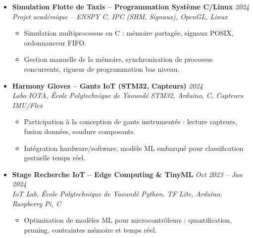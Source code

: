 \documentclass[a4paper,11pt]{article}
\begin{document}
\begin{itemize}[leftmargin=*, label={-}]
\item \textbf{Simulation Flotte de Taxis -- Programmation Système C/Linux} \hfill \textit{2024} \\
\textit{Projet académique -- ENSPY} \hfill \textit{C, IPC (SHM, Signaux), OpenGL, Linux}
\vspace{-2pt}
    \begin{itemize}[leftmargin=0.4cm, nosep, label=\tiny$\bullet$]
        \item \small{Simulation multiprocessus en C : mémoire partagée, signaux POSIX, ordonnanceur FIFO.}
        \item \small{Gestion manuelle de la mémoire, synchronisation de processus concurrents, rigueur de programmation bas niveau.}
    \end{itemize}
\vspace{3pt}

\item \textbf{Harmony Gloves -- Gants IoT (STM32, Capteurs)} \hfill \textit{2024} \\
\textit{Labo IOTA, École Polytechnique de Yaoundé} \hfill \textit{STM32, Arduino, C, Capteurs IMU/Flex}
\vspace{-2pt}
    \begin{itemize}[leftmargin=0.4cm, nosep, label=\tiny$\bullet$]
        \item \small{Participation à la conception de gants instrumentés : lecture capteurs, fusion données, soudure composants.}
        \item \small{Intégration hardware/software, modèle ML embarqué pour classification gestuelle temps réel.}
    \end{itemize}
\vspace{3pt}

\item \textbf{Stage Recherche IoT -- Edge Computing \& TinyML} \hfill \textit{Oct 2023 -- Jan 2024} \\
\textit{IoT Lab, École Polytechnique de Yaoundé} \hfill \textit{Python, TF Lite, Arduino, Raspberry Pi, C}
\vspace{-2pt}
    \begin{itemize}[leftmargin=0.4cm, nosep, label=\tiny$\bullet$]
        \item \small{Optimisation de modèles ML pour microcontrôleurs : quantification, pruning, contraintes mémoire et temps réel.}
    \end{itemize}
\vspace{3pt}

\end{itemize}
\end{document}
